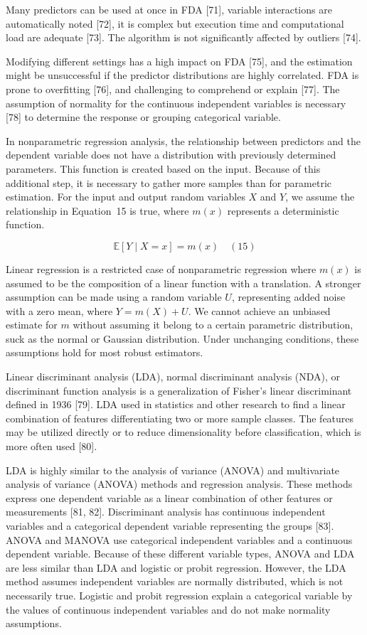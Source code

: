 \documentclass[preprint,12pt]{elsarticle}
\begin{document}
Many predictors can be used at once in FDA [71], variable interactions are automatically noted [72], it is complex but execution time and computational load are adequate [73]. The algorithm is not significantly affected by outliers [74].

Modifying different settings has a high impact on FDA [75], and the estimation might be unsuccessful if the predictor distributions are highly correlated. FDA is prone to overfitting [76], and challenging to comprehend or explain [77]. The assumption of normality for the continuous independent variables is necessary [78] to determine the response or grouping categorical variable. 

In nonparametric regression analysis, the relationship between predictors and the dependent variable does not have a distribution with previously determined parameters. This function is created based on the input. Because of this additional step, it is necessary to gather more samples than for parametric estimation. For the input and output random variables $X$ and $Y$, we assume the relationship in Equation~15 is true, where $m\left(x\right)$ represents a deterministic function.

\begin{equation}
	\mathbb{E}[Y\mid X=x]=m\left(x\right)
	\quad\left(15\right)
\end{equation}

Linear regression is a restricted case of nonparametric regression where $m\left(x\right)$ is assumed to be the composition of a linear function with a translation. A stronger assumption can be made using a random variable $U$, representing added noise with a zero mean, where $Y=m\left(X\right)+U$. We cannot achieve an unbiased estimate for $m$ without assuming it belong to a certain parametric distribution, suck as the normal or Gaussian distribution. Under unchanging conditions, these assumptions hold for most robust estimators.

Linear discriminant analysis (LDA), normal discriminant analysis (NDA), or discriminant function analysis is a generalization of Fisher's linear discriminant defined in 1936 [79]. LDA used in statistics and other research to find a linear combination of features differentiating two or more sample classes. The features may be utilized directly or to reduce dimensionality before classification, which is more often used [80].

LDA is highly similar to the analysis of variance (ANOVA) and multivariate analysis of variance (ANOVA) methods and regression analysis. These methods express one dependent variable as a linear combination of other features or measurements [81, 82]. Discriminant analysis has continuous independent variables and a categorical dependent variable representing the groups [83]. ANOVA and MANOVA use categorical independent variables and a continuous dependent variable. Because of these different variable types, ANOVA and LDA are less similar than LDA and logistic or probit regression. However, the LDA method assumes independent variables are normally distributed, which is not necessarily true. Logistic and probit regression explain a categorical variable by the values of continuous independent variables and do not make normality assumptions.
\end{document}
